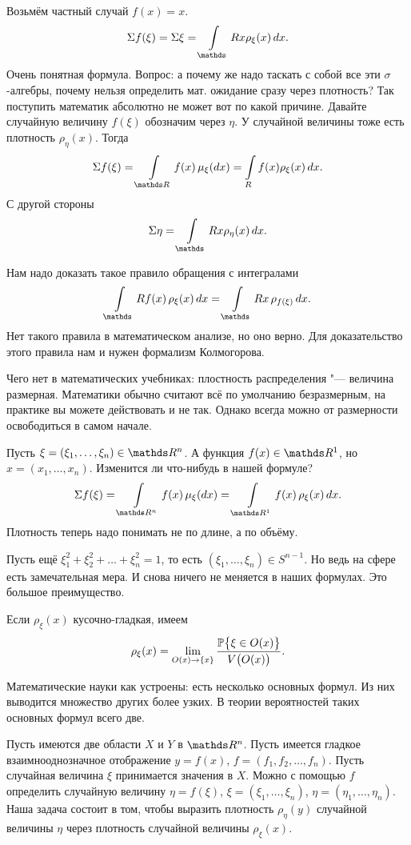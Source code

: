 Возьмём частный случай $f(x) = x$.
\[
  \E f(\xi) = \E\xi = \int\limits_\R x \rho_\xi(x)\,dx.
\]
Очень понятная формула. Вопрос: а почему же надо таскать с собой все эти $\sigma$-алгебры, почему нельзя определить мат. ожидание сразу через плотность? Так поступить математик абсолютно не может вот по какой причине. Давайте случайную величину $f(\xi)$ обозначим через $\eta$. У случайной величины тоже есть плотность $\rho_\eta(x)$. Тогда
\[
  \E f(\xi) = \int\limits_{\R} f(x)\,\mu_\xi(dx) = \int\limits_R f(x) \rho_\xi(x)\,dx.
\]
С другой стороны
\[
  \E\eta = \int\limits_\R x \rho_\eta(x)\,dx.
\]

Нам надо доказать такое правило обращения с интегралами
\[
 \int\limits_\R f(x)\, \rho_\xi(x)\,dx = \int\limits_\R x\,\rho_{f(\xi)}\,dx.
\]
Нет такого правила в математическом анализе, но оно верно. Для доказательство этого правила нам и нужен формализм Колмогорова.

Чего нет в математических учебниках: плостность распределения "--- величина размерная. Математики обычно считают всё по умолчанию безразмерным, на практике вы можете действовать и не так. Однако всегда можно от размерности освободиться в самом начале.

Пусть $\xi = (\xi_1,\dots,\xi_n) \in \R^n$. А функция $f(x)\in \R^1$, но $x = (x_1,\dots,x_n)$. Изменится ли что-нибудь в нашей формуле?
\[
  \E f(\xi) = \int\limits_{\R^n} f(x)\,\mu_\xi(dx) = \int\limits_{\R^1} f(x)\,\rho_\xi(x)\,dx.
\]
Плотность теперь надо понимать не по длине, а по объёму.

Пусть ещё $\xi_1^2 +\xi_2^2+\dots + \xi_n^2 =1$, то есть $(\xi_1,\dots,\xi_n)\in S^{n-1}$. Но ведь на сфере есть замечательная мера. И снова ничего не меняется в наших формулах. Это большое преимущество.

Если $\rho_\xi(x)$ кусочно-гладкая, имеем
\[
  \rho_\xi(x) = \lim\limits_{O(x)\to \{x\}} \frac{ \P\big\{\xi \in O(x)\big\}}{V\big(O(x)\big)}.
\]

Математические науки как устроены: есть несколько основных формул. Из них выводится множество других более узких. В теории вероятностей таких основных формул всего две.

Пусть имеются две области $X$ и $Y$ в $\R^n$. Пусть имеется гладкое взаимнооднозначное отображение $y = f(x)$, $f = (f_1,f_2,\dots, f_n)$. Пусть случайная величина $\xi$ принимается значения в $X$. Можно с помощью $f$ определить случайную величину $\eta = f(\xi)$, $\xi = (\xi_1,\dots,\xi_n)$, $\eta = (\eta_1,\dots, \eta_n)$. Наша задача состоит в том, чтобы выразить плотность $\rho_\eta(y)$ случайной величины $\eta$ через плотность случайной величины $\rho_\xi(x)$.

